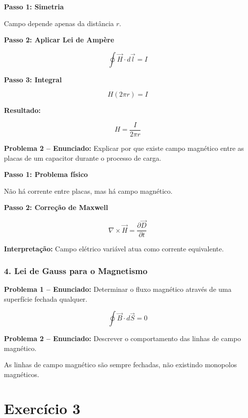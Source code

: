 \documentclass[12pt,a4paper]{article}
\begin{document}
\textbf{Passo 1: Simetria}

Campo depende apenas da distância $r$.

\textbf{Passo 2: Aplicar Lei de Ampère}

\begin{equation}
\oint \vec{H} \cdot d\vec{l} = I
\end{equation}

\textbf{Passo 3: Integral}

\begin{equation}
H (2\pi r) = I
\end{equation}

\textbf{Resultado:}

\begin{equation}
\boxed{H = \frac{I}{2\pi r}}
\end{equation}

\textbf{Problema 2 -- Enunciado:} Explicar por que existe campo magnético entre as placas de um capacitor durante o processo de carga.

\textbf{Passo 1: Problema físico}

Não há corrente entre placas, mas há campo magnético.

\textbf{Passo 2: Correção de Maxwell}

\begin{equation}
\nabla \times \vec{H} = \frac{\partial \vec{D}}{\partial t}
\end{equation}

\textbf{Interpretação:} Campo elétrico variável atua como corrente equivalente.

\subsubsection*{4. Lei de Gauss para o Magnetismo}

\textbf{Problema 1 -- Enunciado:} Determinar o fluxo magnético através de uma superfície fechada qualquer.

\begin{equation}
    \boxed{\oint \vec{B} \cdot d\vec{S} = 0}
\end{equation}

\textbf{Problema 2 -- Enunciado:} Descrever o comportamento das linhas de campo magnético.

As linhas de campo magnético são sempre fechadas, não existindo monopolos magnéticos.

\section*{Exercício 3}
\end{document}
